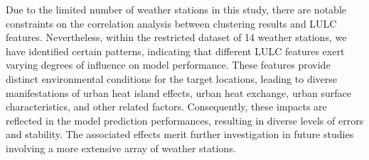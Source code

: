 \documentclass[a4paper,fleqn]{cas-sc}
\begin{document}
Due to the limited number of weather stations in this study, there are notable constraints on the correlation analysis between clustering results and LULC features. Nevertheless, within the restricted dataset of 14 weather stations, we have identified certain patterns, indicating that different LULC features exert varying degrees of influence on model performance. These features provide distinct environmental conditions for the target locations, leading to diverse manifestations of urban heat island effects, urban heat exchange, urban surface characteristics, and other related factors. Consequently, these impacts are reflected in the model prediction performances, resulting in diverse levels of errors and stability. The associated effects merit further investigation in future studies involving a more extensive array of weather stations.
\end{document}
